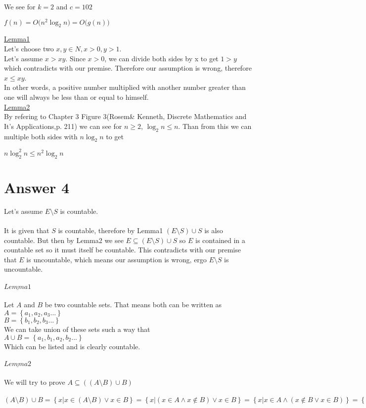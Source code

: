 \documentclass[12pt]{article}
\begin{document}
We see for $k=2$ and $c=102$
\begin{center}
$f(n)=O\big (n^2\log_2n\big )=O\big (g(n)\big )$
\end{center}

\underline{Lemma1}\\
Let's choose two $x,y\in N, x>0,y>1$.\\
Let's assume $x>xy$. Since $x>0$, we can divide both sides by x to get $1>y$ which contradicts with our premise. Therefore our assumption is wrong, therefore $x\leq xy$.\\
In other words, a positive number multiplied with another number greater than one will always be less than or equal to himself.\\

\underline{Lemma2}\\
By refering to Chapter 3  Figure 3(Rosem\& Kenneth, Discrete Mathematics and It's Applications,p. 211) we can see for $n\geq 2$, $\log_2n\leq n$. Than from this we can multiple both sides with $n\log_2n$ to get
\begin{center}
$n\log^2_2n\leq n^2\log_2n$
\end{center}


\section*{Answer 4}

Let's assume $E\setminus S$ is countable. \\ \\It is given that $S$ is countable, therefore by Lemma1 $(E\setminus S) \cup S$ is also countable. But then by Lemma2 we see $E \subseteq (E\setminus S) \cup S$ so $E$ is contained in a countable set so it must itself be countable. This contradicts with our premise that $E$ is uncountable, which means our assumption is wrong, ergo $E\setminus S$ is uncountable. \\ \\$\underline{Lemma1}$\\ \\ Let $A$ and $B$ be two countable sets. That means both can be written as \\  $A=\left\{{a_1,a_2,a_3...  }\right\}$ \\ $B=\left\{{b_1,b_2,b_3...  }\right\}$\\ We can take union of these sets such a way that \\ $A\cup B=\left\{ {a_1,b_1,a_2,b_2...}\right\}$\\Which can be listed and is clearly countable. \\ \\ $\underline{Lemma2}$\\ \\ We will try to prove $A\subseteq((A\setminus B) \cup B)$\\ \\ $(A\setminus B)\cup B=\left\{ { x | x\in (A\setminus B) \vee x\in B}\right\} = \left\{{ x| (x\in A \wedge x \not \in B)\vee x \in B} \right\} = \left\{{ x | x\in A \wedge (x\not \in B \vee x \in B)}\right\} = \left\{{ x|x\in A \wedge (TRUE)}\right\}=\left\{{x|x\in A}\right\}=A$
\end{document}
